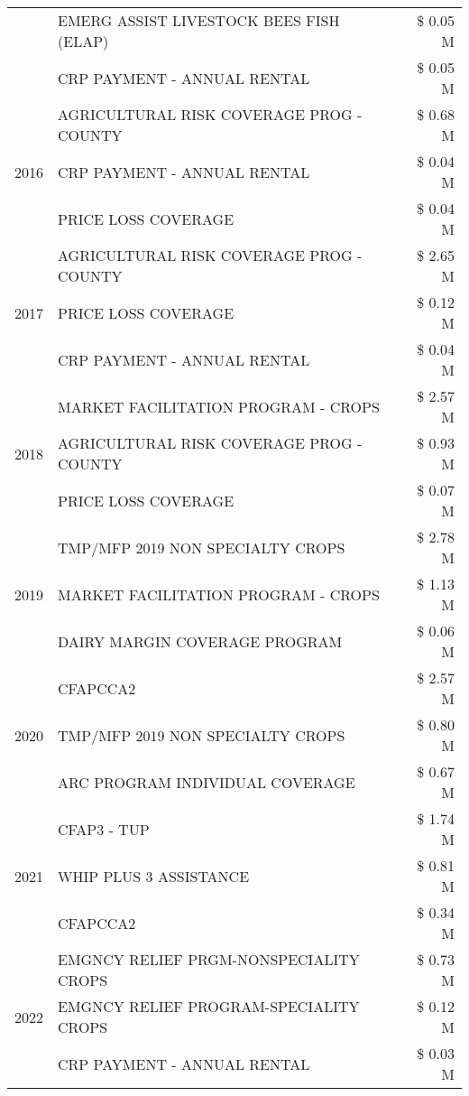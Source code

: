 \begin{tabular}{llr}
 & EMERG ASSIST LIVESTOCK BEES FISH (ELAP) & \$ 0.05 M \\
 & CRP PAYMENT - ANNUAL RENTAL & \$ 0.05 M \\
\cline{1-3}
\multirow[t]{3}{*}{2016} & AGRICULTURAL RISK COVERAGE PROG - COUNTY & \$ 0.68 M \\
 & CRP PAYMENT - ANNUAL RENTAL & \$ 0.04 M \\
 & PRICE LOSS COVERAGE & \$ 0.04 M \\
\cline{1-3}
\multirow[t]{3}{*}{2017} & AGRICULTURAL RISK COVERAGE PROG - COUNTY & \$ 2.65 M \\
 & PRICE LOSS COVERAGE & \$ 0.12 M \\
 & CRP PAYMENT - ANNUAL RENTAL & \$ 0.04 M \\
\cline{1-3}
\multirow[t]{3}{*}{2018} & MARKET FACILITATION PROGRAM - CROPS & \$ 2.57 M \\
 & AGRICULTURAL RISK COVERAGE PROG - COUNTY & \$ 0.93 M \\
 & PRICE LOSS COVERAGE & \$ 0.07 M \\
\cline{1-3}
\multirow[t]{3}{*}{2019} & TMP/MFP 2019 NON SPECIALTY CROPS & \$ 2.78 M \\
 & MARKET FACILITATION PROGRAM - CROPS & \$ 1.13 M \\
 & DAIRY MARGIN COVERAGE PROGRAM & \$ 0.06 M \\
\cline{1-3}
\multirow[t]{3}{*}{2020} & CFAPCCA2 & \$ 2.57 M \\
 & TMP/MFP 2019 NON SPECIALTY CROPS & \$ 0.80 M \\
 & ARC PROGRAM INDIVIDUAL COVERAGE & \$ 0.67 M \\
\cline{1-3}
\multirow[t]{3}{*}{2021} & CFAP3 - TUP & \$ 1.74 M \\
 & WHIP PLUS 3 ASSISTANCE & \$ 0.81 M \\
 & CFAPCCA2 & \$ 0.34 M \\
\cline{1-3}
\multirow[t]{3}{*}{2022} & EMGNCY RELIEF PRGM-NONSPECIALITY CROPS & \$ 0.73 M \\
 & EMGNCY RELIEF PROGRAM-SPECIALITY CROPS & \$ 0.12 M \\
 & CRP PAYMENT - ANNUAL RENTAL & \$ 0.03 M \\
\cline{1-3}
\bottomrule
\end{tabular}
